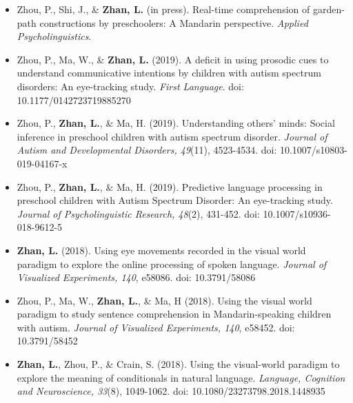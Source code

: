 \documentclass[
  12pt,
]{article}
\begin{document}
\begin{itemize}
\item
  Zhou, P., Shi, J., \& \textbf{Zhan, L.} (in press). Real-time
  comprehension of garden-path constructions by preschoolers: A Mandarin
  perspective. \emph{Applied Psycholinguistics}.
\item
  Zhou, P., Ma, W., \& \textbf{Zhan, L.} (2019). A deficit in using
  prosodic cues to understand communicative intentions by children with
  autism spectrum disorders: An eye-tracking study. \emph{First
  Language}. doi: 10.1177/0142723719885270
  \href{https://publications.likan.info/Periodicals/FirstLang2019.pdf}{
  \faFilePdf[regular] }
\item
  Zhou, P., \textbf{Zhan, L.}, \& Ma, H. (2019). Understanding others'
  minds: Social inference in preschool children with autism spectrum
  disorder. \emph{Journal of Autism and Developmental Disorders,
  49}(11), 4523-4534. doi: 10.1007/s10803-019-04167-x
  \href{https://publications.likan.info/Periodicals/JAutismDevDisord2019.pdf}{
  \faFilePdf[regular] }
\item
  Zhou, P., \textbf{Zhan, L.}, \& Ma, H. (2019). Predictive language
  processing in preschool children with Autism Spectrum Disorder: An
  eye-tracking study. \emph{Journal of Psycholinguistic Research,
  48}(2), 431-452. doi: 10.1007/s10936-018-9612-5
  \href{https://publications.likan.info/Periodicals/JPsycholinguistRes2018.pdf}{
  \faFilePdf[regular] }
\item
  \textbf{Zhan, L.} (2018). Using eye movements recorded in the visual
  world paradigm to explore the online processing of spoken language.
  \emph{Journal of Visualized Experiments, 140}, e58086. doi:
  10.3791/58086
  \href{https://publications.likan.info/Periodicals/jove-protocol-58086.pdf}{
  \faFilePdf[regular] }
\item
  Zhou, P., Ma, W., \textbf{Zhan, L.}, \& Ma, H (2018). Using the visual
  world paradigm to study sentence comprehension in Mandarin-speaking
  children with autism. \emph{Journal of Visualized Experiments, 140},
  e58452. doi: 10.3791/58452
  \href{https://publications.likan.info/Periodicals/jove-protocol-58452.pdf}{
  \faFilePdf[regular] }
\item
  \textbf{Zhan, L.}, Zhou, P., \& Crain, S. (2018). Using the
  visual-world paradigm to explore the meaning of conditionals in
  natural language. \emph{Language, Cognition and Neuroscience, 33}(8),
  1049-1062. doi: 10.1080/23273798.2018.1448935
  \href{https://publications.likan.info/Periodicals/LangCognNeurosci2018.pdf}{
}
\end{itemize}
\end{document}
